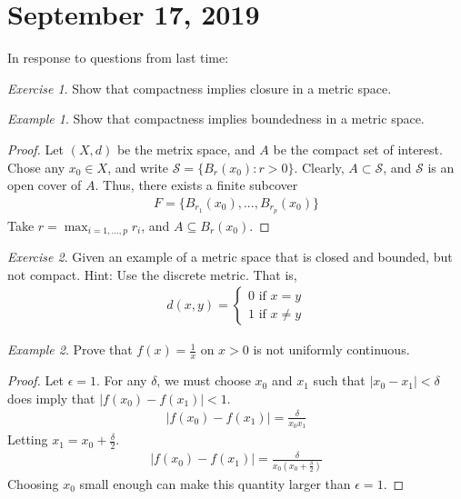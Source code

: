 \documentclass[11pt]{article}
\newcommand{\e}{\epsilon}
\newcommand{\sse}{\subseteq}
\theoremstyle{plain}
\theoremstyle{definition}
\theoremstyle{remark}
\newtheorem{exm}{Example}[section]
\newtheorem{exc}{Exercise}[section]
\begin{document}
\section{September 17, 2019}

In response to questions from last time:
\begin{exc}
    Show that compactness implies closure in a metric space.
\end{exc}
\begin{exm}
    Show that compactness implies boundedness in a metric space.
    \begin{proof}
        Let $(X,d)$ be the metrix space, and $A$ be the compact set of interest. Chose any $x_0 \in X$, and write $\mathcal{S} = \{B_r(x_0) : r > 0\}$. Clearly, $A \subset \mathcal{S}$, and $\mathcal{S}$ is an open cover of $A$. Thus, there exists a finite subcover
        \begin{align*}
            F = \{B_{r_1}(x_0), ..., B_{r_p}(x_0)\}
        \end{align*}
        Take $r = \max_{i=1,...,p} r_i$, and $A \sse B_r(x_0)$.
    \end{proof}
\end{exm}
\begin{exc}
    Given an example of a metric space that is closed and bounded, but not compact. Hint: Use the discrete metric. That is,
    \begin{align*}
        d(x,y) = \begin{cases}
        0 \text{ if } x = y\\
        1 \text{ if } x \neq y
        \end{cases}
    \end{align*}
\end{exc}
\begin{exm}
    Prove that $f(x) = \frac{1}{x}$ on $x > 0$ is not uniformly continuous.
    \begin{proof}
        Let $\e = 1$. For any $\delta$, we must choose $x_0$ and $x_1$ such that $|x_0 - x_1| < \delta$ does imply that $|f(x_0) - f(x_1)| < 1$.
        \begin{align*}
            |f(x_0) - f(x_1)| = \frac{\delta}{x_0 x_1}
        \end{align*}
        Letting $x_1 = x_0 + \frac{\delta}{2}$.
        \begin{align*}
            |f(x_0) - f(x_1)| = \frac{\delta}{x_0 (x_0 + \frac{\delta}{2})}
        \end{align*}
        Choosing $x_0$ small enough can make this quantity larger than $\e = 1$.
    \end{proof}
\end{exm}
\end{document}

